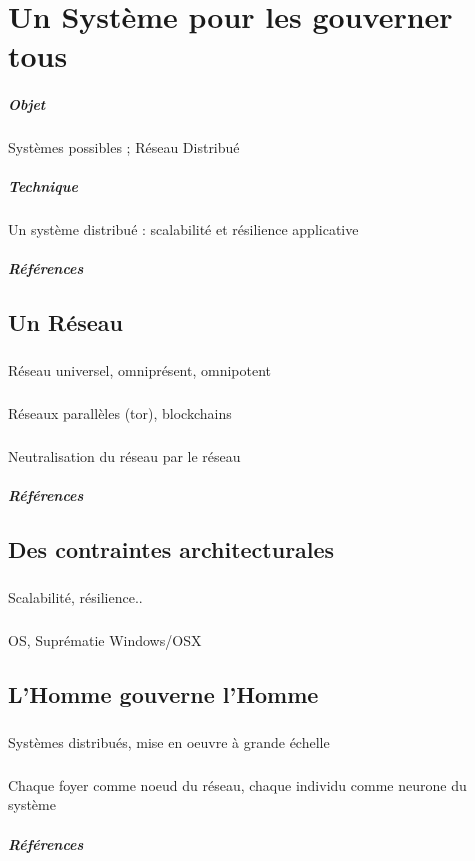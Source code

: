 \chapter{Un Système pour les gouverner tous}
\paragraph{Objet} Systèmes possibles ; Réseau Distribué
\paragraph{Technique} Un système distribué : scalabilité et résilience applicative
\paragraph{Références}
\cite{Deleuze:0}
\cite{Foucault:0}
\cite{Negri:0}
\cite{Pieces:0}
\cite{ProgrammableCity:0}
\cite{ProgrammableCity:1}
\cite{PsychoPass}

\section{Un Réseau}
\paragraph{} Réseau universel, omniprésent, omnipotent
\paragraph{} Réseaux parallèles (tor), blockchains
\paragraph{} Neutralisation du réseau par le réseau
\paragraph{Références} \cite{DarkWeb:0}

\section{Des contraintes architecturales}
\paragraph{} Scalabilité, résilience..
\paragraph{} OS, Suprématie Windows/OSX

\section{L'Homme gouverne l'Homme}
\paragraph{} Systèmes distribués, mise en oeuvre à grande échelle
\paragraph{} Chaque foyer comme noeud du réseau, chaque individu comme neurone du système
\paragraph{Références} \cite{GhostInTheShell}